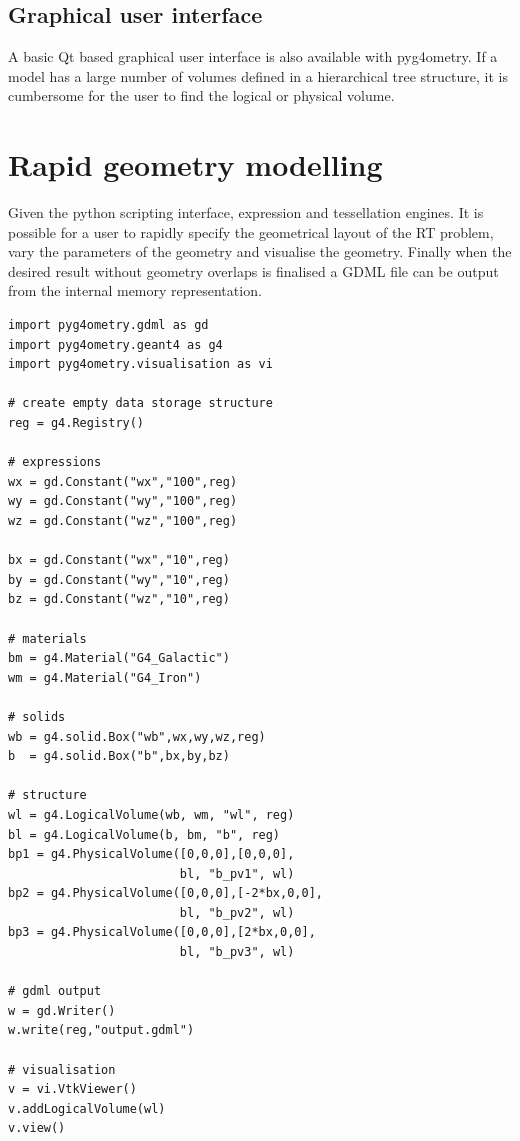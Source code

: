 \documentclass[final,5p,times,twocolumn]{elsarticle}
\begin{document}
\subsection{Graphical user interface}
A basic Qt based graphical user interface is also available with pyg4ometry. If a model has a large number of volumes defined in a hierarchical tree structure, it is cumbersome for the user to find the logical or physical volume.    

\section{Rapid geometry modelling}
Given the python scripting interface, expression  and tessellation engines. It is possible for a user to rapidly specify the geometrical layout of the RT problem, vary 
the parameters of the geometry and visualise the geometry. Finally when the desired result without geometry overlaps is finalised a GDML file can be output
from the internal memory representation. 

{\small
\begin{verbatim}
import pyg4ometry.gdml as gd
import pyg4ometry.geant4 as g4
import pyg4ometry.visualisation as vi

# create empty data storage structure
reg = g4.Registry()

# expressions 
wx = gd.Constant("wx","100",reg)
wy = gd.Constant("wy","100",reg)
wz = gd.Constant("wz","100",reg)

bx = gd.Constant("wx","10",reg)
by = gd.Constant("wy","10",reg)
bz = gd.Constant("wz","10",reg)

# materials
bm = g4.Material("G4_Galactic") 
wm = g4.Material("G4_Iron") 

# solids
wb = g4.solid.Box("wb",wx,wy,wz,reg)
b  = g4.solid.Box("b",bx,by,bz)

# structure 
wl = g4.LogicalVolume(wb, wm, "wl", reg)
bl = g4.LogicalVolume(b, bm, "b", reg)
bp1 = g4.PhysicalVolume([0,0,0],[0,0,0], 
                        bl, "b_pv1", wl) 
bp2 = g4.PhysicalVolume([0,0,0],[-2*bx,0,0], 
                        bl, "b_pv2", wl)  
bp3 = g4.PhysicalVolume([0,0,0],[2*bx,0,0], 
                        bl, "b_pv3", wl) 
                        
# gdml output
w = gd.Writer()
w.write(reg,"output.gdml")

# visualisation 
v = vi.VtkViewer()
v.addLogicalVolume(wl)
v.view()
\end{verbatim}
}
\end{document}
